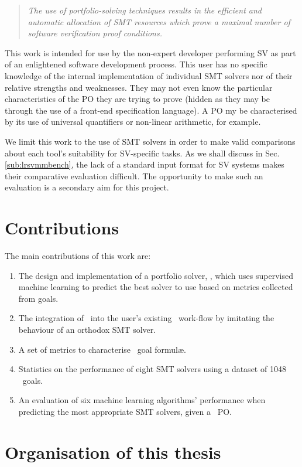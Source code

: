 \begin{quote}
	\textit{The use of portfolio-solving techniques results in the efficient and \nobreakdash automatic allocation of SMT resources which prove a maximal number of \nobreakdash software verification proof conditions.}
\end{quote}

This work is intended for use by the non-expert developer performing SV as part of an enlightened software development process.
This user has no specific knowledge of the internal implementation of individual SMT solvers nor of their relative strengths and weaknesses. 
They may not even know the particular characteristics of the PO they are trying to prove (hidden as they may be through the use of a front-end specification language).
A PO my be characterised by its use of universal quantifiers or non-linear arithmetic, for example.

We limit this work to the use of SMT solvers in order to make valid comparisons about each tool's suitability for SV-specific tasks.
As we shall discuss in Sec. \ref{sub:lrsvmmbench}, the lack of a standard input format for SV systems makes their comparative evaluation difficult.
The opportunity to make such an evaluation is a secondary aim for this project.

\section{Contributions}
The main contributions of this work are:
\begin{enumerate}
	\item The design  and implementation of a portfolio solver, \where, which uses supervised machine learning to predict the best solver to use based on metrics collected from goals.
	\item The integration of \where~into the user's existing \why~work-flow by imitating the behaviour of an orthodox SMT solver.
	\item A set of metrics to characterise \why~goal formul\ae.
	\item Statistics on the performance of eight SMT solvers using a dataset of 1048 \why~goals.
	\item An evaluation of six machine learning algorithms' performance when predicting the most appropriate SMT solvers, given a \why~PO.  
	
\end{enumerate}

\section{Organisation of this thesis}

